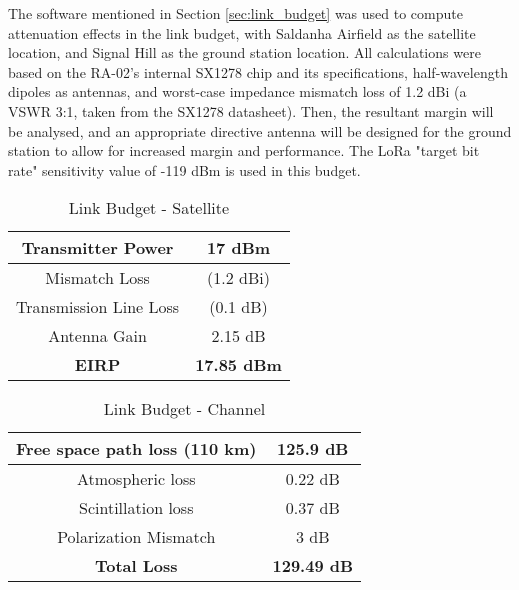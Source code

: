The software mentioned in Section \ref{sec:link_budget} was used to compute attenuation effects in the link budget, with Saldanha Airfield as the satellite location, and Signal Hill as the ground station location.
All calculations were based on the RA-02's internal SX1278 chip and its specifications, half-wavelength dipoles as antennas, and worst-case impedance mismatch loss of 1.2 dBi (a VSWR 3:1, taken from the SX1278 datasheet). Then, the resultant margin will be analysed, and an appropriate directive antenna will be designed for the ground station to allow for increased margin and performance. The LoRa "target bit rate" sensitivity value of -119 dBm is used in this budget.

\newpage

\begin{table}[!htb]
  \centering
  \renewcommand{\arraystretch}{1.2}
  \begin{tabular}{ |c|c| }
  \hline
  Transmitter Power             & 17 dBm                    \\ \hline
  Mismatch Loss                 & (1.2 dBi)                 \\ \hline
  Transmission Line Loss        & (0.1 dB)                  \\ \hline
  Antenna Gain                  & 2.15 dB                   \\ \hline \hline
  \textbf{EIRP}                 & \textbf{17.85 dBm}        \\ \hline
  \end{tabular}
  \caption{Link Budget - Satellite}
  \label{tab:link_budget_satellite}
\end{table}

\begin{table}[!htb]
  \centering
  \renewcommand{\arraystretch}{1.2}
  \begin{tabular}{ |c|c| }
  \hline
  Free space path loss (110 km) & 125.9 dB                  \\ \hline
  Atmospheric loss              & 0.22 dB                   \\ \hline
  Scintillation loss            & 0.37 dB                   \\ \hline
  Polarization Mismatch         & 3 dB                      \\ \hline
  \textbf{Total Loss}           & \textbf{129.49 dB}         \\ \hline
  \end{tabular}
  \caption{Link Budget - Channel}
  \label{tab:link_budget_channel}
\end{table}

